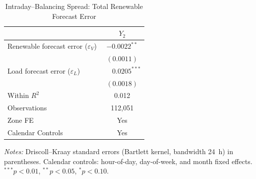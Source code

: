 \documentclass{article}
\begin{document}
\begin{table}[htbp]
\centering
\caption{Intraday--Balancing Spread: Total Renewable Forecast Error}
\label{tab:r4_totalv}
\begin{threeparttable}
\begin{tabularx}{\linewidth}{>{\raggedright\arraybackslash}Xc}
\toprule
 & $Y_2$ \\
\midrule
Renewable forecast error ($\varepsilon_V$) & $-0.0022^{**}$ \\
 & $(0.0011)$ \\[0.4ex]
Load forecast error ($\varepsilon_L$) & $\phantom{-}0.0205^{***}$ \\
 & $(0.0018)$ \\
\midrule
Within $R^2$ & 0.012 \\
Observations & 112,051 \\
Zone FE & Yes \\
Calendar Controls & Yes \\
\bottomrule
\end{tabularx}
\begin{tablenotes}[flushleft]
\footnotesize
\item \textit{Notes:} Driscoll--Kraay standard errors (Bartlett kernel, bandwidth 24~h) in parentheses. Calendar controls: hour-of-day, day-of-week, and month fixed effects. $^{***}p<0.01$, $^{**}p<0.05$, $^{*}p<0.10$.
\end{tablenotes}
\end{threeparttable}
\end{table}
\end{document}
